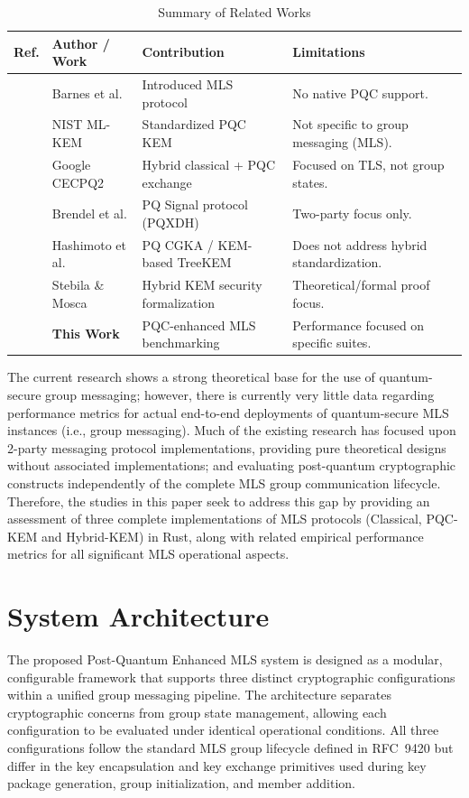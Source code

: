 \documentclass{ieeeaccess}
\begin{document}
\begin{table}[t]
\centering
\caption{Summary of Related Works}
\label{tab:related_works}
\begin{tabular}{|p{1cm}|p{3.5cm}|p{5cm}|p{6cm}|}
\hline
\textbf{Ref.} & \textbf{Author / Work} & \textbf{Contribution} & \textbf{Limitations} \\ \hline
[1] & Barnes et al. & Introduced MLS protocol & No native PQC support. \\ \hline
[2] & NIST ML-KEM & Standardized PQC KEM & Not specific to group messaging (MLS). \\ \hline
[3] & Google CECPQ2 & Hybrid classical + PQC exchange & Focused on TLS, not group states. \\ \hline
[4] & Brendel et al. & PQ Signal protocol (PQXDH) & Two-party focus only. \\ \hline
[5] & Hashimoto et al. & PQ CGKA / KEM-based TreeKEM & Does not address hybrid standardization. \\ \hline
[6] & Stebila \& Mosca & Hybrid KEM security formalization & Theoretical/formal proof focus. \\ \hline
[7] & \textbf{This Work} & PQC-enhanced MLS benchmarking & Performance focused on specific suites. \\ \hline
\end{tabular}
\end{table}

The current research shows a strong theoretical base for the use of quantum-secure group messaging; however, there is currently very little data regarding performance metrics for actual end-to-end deployments of quantum-secure MLS instances (i.e., group messaging). Much of the existing research has focused upon 2-party messaging protocol implementations, providing pure theoretical designs without associated implementations; and evaluating post-quantum cryptographic constructs independently of the complete MLS group communication lifecycle. Therefore, the studies in this paper seek to address this gap by providing an assessment of three complete implementations of MLS protocols (Classical, PQC-KEM and Hybrid-KEM) in Rust, along with related empirical performance metrics for all significant MLS operational aspects.

\section{System Architecture}

The proposed Post-Quantum Enhanced MLS system is designed as a modular, configurable
framework that supports three distinct cryptographic configurations within a unified
group messaging pipeline. The architecture separates cryptographic concerns from
group state management, allowing each configuration to be evaluated under identical
operational conditions. All three configurations follow the standard MLS group
lifecycle defined in RFC~9420 but differ in the key encapsulation and key exchange
primitives used during key package generation, group initialization, and member
addition.
\end{document}
